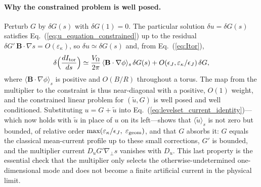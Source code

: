 \documentclass[english]{article}
\newcommand{\bB}{\mathbf{B}}
\newcommand{\gradperp}{\nabla_{\!\perp}}
\begin{document}
\paragraph{Why the constrained problem is well posed.}
Perturb $G$ by $\delta G(s)$ with $\delta G(1)=0$. The particular solution $\delta u=\delta G(s)$
satisfies Eq.~(\ref{eq:u_equation_constrained}) up to the residual $\delta G'\,\bB\cdot\nabla s
=O(\varepsilon_\kappa)$, so $\delta u\simeq\delta G(s)$ and, from Eq.~(\ref{eq:Itor}),
\begin{equation}
\delta\Big(\frac{dI_{\rm tor}}{ds}\Big)
\simeq\frac{V_\Omega}{2\pi}\,\langle\bB\cdot\nabla\phi\rangle_s\,\delta G(s)
+O(\epsilon_J,\varepsilon_\kappa/\epsilon_J)\,\delta G ,
\label{eq:G_response}
\end{equation}
where $\langle\bB\cdot\nabla\phi\rangle_s$ is positive and $O(B/R)$ throughout a torus. The map
from the multiplier to the constraint is thus near-diagonal with a positive, $O(1)$ weight, and the
constrained linear problem for $(\tilde u,G)$ is well posed and well conditioned. Substituting
$u=G+\tilde u$ into Eq.~(\ref{eq:levelset_current_identity})---which now holds with $\tilde u$ in
place of $u$ on its left---shows that $\langle\tilde u\rangle_s$ is not zero but bounded, of
relative order $\max(\varepsilon_\kappa/\epsilon_J,\;\varepsilon_{\rm geom})$, and that $G$
absorbs it: $G$ equals the classical mean-current profile up to these small corrections, $G'$ is
bounded, and the multiplier current $D_uG'\gradperp s$ vanishes with $D_u$. This last property is
the essential check that the multiplier only selects the otherwise-undetermined one-dimensional
mode and does not become a finite artificial current in the physical limit.
\end{document}
